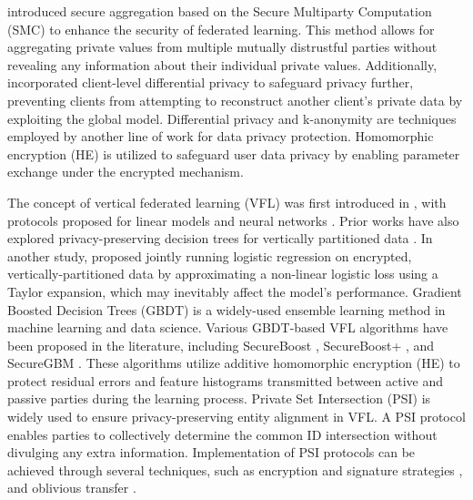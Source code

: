 \documentclass[10pt,journal,compsoc]{IEEEtran}
\begin{document}
\citet{bonawitz2017practical} introduced secure aggregation based on the Secure Multiparty Computation (SMC) to enhance the security of federated learning. This method allows for aggregating private values from multiple mutually distrustful parties without revealing any information about their individual private values. Additionally, \citet{geyer2017differentially} incorporated client-level differential privacy to safeguard privacy further, preventing clients from attempting to reconstruct another client's private data by exploiting the global model. Differential privacy \cite{dwork2008differential} and k-anonymity \cite{sweeney2002k} are techniques employed by another line of work for data privacy protection. Homomorphic encryption (HE) \cite{rivest1978data} is utilized to safeguard user data privacy by enabling parameter exchange under the encrypted mechanism.

The concept of vertical federated learning (VFL) was first introduced in \cite{yang2019federated,hardy2017private}, with protocols proposed for linear models \cite{hardy2017private,liu2019communication} and neural networks \cite{liu2020secure}. Prior works have also explored privacy-preserving decision trees for vertically partitioned data \cite{vaidya2008privacy}. In another study, \citet{djatmiko2017privacy} proposed jointly running logistic regression on encrypted, vertically-partitioned data by approximating a non-linear logistic loss using a Taylor expansion, which may inevitably affect the model's performance. Gradient Boosted Decision Trees (GBDT) \cite{friedman2001greedy} is a widely-used ensemble learning method in machine learning and data science. Various GBDT-based VFL algorithms have been proposed in the literature, including SecureBoost \cite{cheng2021secureboost}, SecureBoost+ \cite{chen2021secureboost+}, and SecureGBM \cite{feng2019securegbm}. These algorithms utilize additive homomorphic encryption (HE) to protect residual errors and feature histograms transmitted between active and passive parties during the learning process. Private Set Intersection (PSI) is widely used to ensure privacy-preserving entity alignment in VFL. A PSI protocol enables parties to collectively determine the common ID intersection without divulging any extra information. Implementation of PSI protocols can be achieved through several techniques, such as encryption and signature strategies \cite{liang2004privacy}, and oblivious transfer \cite{pinkas2014faster,pinkas2018scalable}.  
\end{document}
